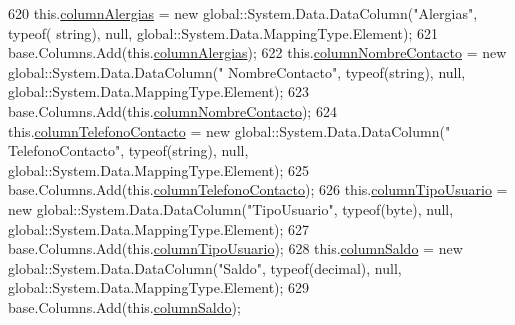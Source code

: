 \begin{DoxyCode}
620                 this.\hyperlink{class_proyecto___integrador__3_1_1ds_usuarios_1_1_usuarios_data_table_afd6b2ab9618c5bcfa6d2837c4709b6fa}{columnAlergias} = \textcolor{keyword}{new} global::System.Data.DataColumn(\textcolor{stringliteral}{"Alergias"}, typeof(\textcolor{keywordtype}{
      string}), null, global::System.Data.MappingType.Element);
621                 base.Columns.Add(this.\hyperlink{class_proyecto___integrador__3_1_1ds_usuarios_1_1_usuarios_data_table_afd6b2ab9618c5bcfa6d2837c4709b6fa}{columnAlergias});
622                 this.\hyperlink{class_proyecto___integrador__3_1_1ds_usuarios_1_1_usuarios_data_table_a16ac4bffb8b2cd014f1bbec318b3e275}{columnNombreContacto} = \textcolor{keyword}{new} global::System.Data.DataColumn(\textcolor{stringliteral}{"
      NombreContacto"}, typeof(\textcolor{keywordtype}{string}), null, global::System.Data.MappingType.Element);
623                 base.Columns.Add(this.\hyperlink{class_proyecto___integrador__3_1_1ds_usuarios_1_1_usuarios_data_table_a16ac4bffb8b2cd014f1bbec318b3e275}{columnNombreContacto});
624                 this.\hyperlink{class_proyecto___integrador__3_1_1ds_usuarios_1_1_usuarios_data_table_a05833005cbc7f43edd9b091088296d8d}{columnTelefonoContacto} = \textcolor{keyword}{new} global::System.Data.DataColumn(\textcolor{stringliteral}{"
      TelefonoContacto"}, typeof(\textcolor{keywordtype}{string}), null, global::System.Data.MappingType.Element);
625                 base.Columns.Add(this.\hyperlink{class_proyecto___integrador__3_1_1ds_usuarios_1_1_usuarios_data_table_a05833005cbc7f43edd9b091088296d8d}{columnTelefonoContacto});
626                 this.\hyperlink{class_proyecto___integrador__3_1_1ds_usuarios_1_1_usuarios_data_table_a8938f731b53fecd95f82aa86ae3db1d2}{columnTipoUsuario} = \textcolor{keyword}{new} global::System.Data.DataColumn(\textcolor{stringliteral}{"TipoUsuario"},
       typeof(byte), null, global::System.Data.MappingType.Element);
627                 base.Columns.Add(this.\hyperlink{class_proyecto___integrador__3_1_1ds_usuarios_1_1_usuarios_data_table_a8938f731b53fecd95f82aa86ae3db1d2}{columnTipoUsuario});
628                 this.\hyperlink{class_proyecto___integrador__3_1_1ds_usuarios_1_1_usuarios_data_table_a2c6a39259573ff67502746b7c598768f}{columnSaldo} = \textcolor{keyword}{new} global::System.Data.DataColumn(\textcolor{stringliteral}{"Saldo"}, typeof(decimal), 
      null, global::System.Data.MappingType.Element);
629                 base.Columns.Add(this.\hyperlink{class_proyecto___integrador__3_1_1ds_usuarios_1_1_usuarios_data_table_a2c6a39259573ff67502746b7c598768f}{columnSaldo});

\end{DoxyCode}
